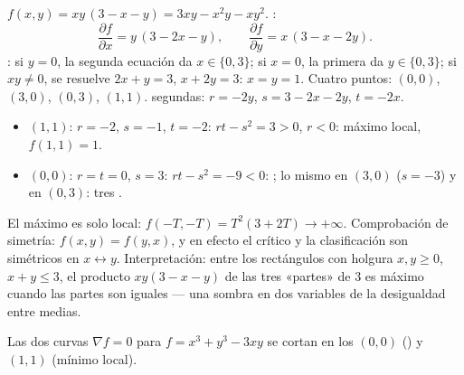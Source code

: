 \begin{example}
\label{ex:b1:multivar:fourpoints}
$f(x, y) = xy\,(3 - x - y) = 3xy - x^2y - xy^2$. :
\[
\frac{\partial f}{\partial x} = y\,(3 - 2x - y),
\qquad
\frac{\partial f}{\partial y} = x\,(3 - x - 2y).
\]
: si $y = 0$, la segunda ecuación da $x \in
\{0, 3\}$; si $x = 0$, la primera da $y \in \{0, 3\}$; si $xy
\neq 0$, se resuelve $2x + y = 3$, $x + 2y = 3$: $x = y = 1$. Cuatro
puntos: $(0,0)$, $(3,0)$, $(0,3)$, $(1,1)$.  segundas:
$r = -2y$, $s = 3 - 2x - 2y$, $t = -2x$.
\begin{itemize}
  \item $(1,1)$: $r = -2$, $s = -1$, $t = -2$: $rt - s^2 = 3 >
        0$, $r < 0$: máximo local, $f(1,1) = 1$.
  \item $(0,0)$: $r = t = 0$, $s = 3$: $rt - s^2 = -9 < 0$:
        ; lo mismo en $(3, 0)$ ($s = -3$) y en $(0, 3)$:
        tres .
\end{itemize}
El máximo es solo local: $f(-T, -T) = T^2(3 + 2T) \to
+\infty$. Comprobación de simetría: $f(x, y) = f(y, x)$, y en efecto el
 crítico y la clasificación son simétricos en $x
\leftrightarrow y$. Interpretación: entre los rectángulos con holgura
$x, y \geq 0$, $x + y \leq 3$, el producto $xy(3 - x - y)$ de
las tres «partes» de $3$ es máximo cuando las partes son iguales
--- una sombra en dos variables de la desigualdad entre medias.
\end{example}

\begin{omfigure}

{\small Las dos curvas $\nabla f = 0$ para $f = x^3 + y^3 - 3xy$
se cortan en los  $(0,0)$ () y $(1,1)$
(mínimo local).}
\end{omfigure}

